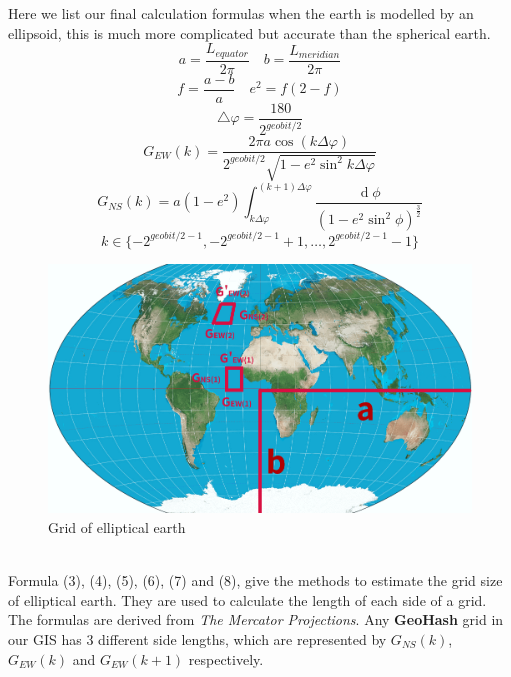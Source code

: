 \documentclass[sigplan,screen]{acmart}
\begin{document}
Here we list our final calculation formulas when the earth is modelled by an ellipsoid, this is much more complicated but accurate than the spherical earth.
\begin{equation}
	a=\frac{L_{equator}}{2\pi}\quad b=\frac{L_{meridian}}{2\pi}
\end{equation}
\begin{equation}
	f=\frac{a-b}{a}\quad e^2=f(2-f)
\end{equation}
\begin{equation}
	\bigtriangleup\varphi=\frac{180}{2^{geobit/2}}
\end{equation}
\begin{equation}
	G_{EW}(k)=\frac{2\pi a\cos(k\Delta\varphi)}{2^{geobit/2}\sqrt{1-e^2\sin^2k\Delta\varphi}}
\end{equation}
\begin{equation}
	G_{NS}(k)=a(1-e^2)\int_{k\Delta\varphi}^{(k+1)\Delta\varphi}\frac{\operatorname d\phi}{{(1-e^2\sin^2\phi)}^\frac32}
\end{equation}
\begin{equation}
	k\in\{-2^{geobit/2-1}, -2^{geobit/2-1}+1, \ldots, 2^{geobit/2-1}-1\}
\end{equation}
\begin{figure}[htb]
	\centering\includegraphics[width=\linewidth]{earth.png}
	\caption{Grid of elliptical earth}
\end{figure}
\\
Formula (3), (4), (5), (6), (7) and (8), give the methods to estimate the grid size of elliptical earth.
They are used to calculate the length of each side of a grid.
The formulas are derived from \textit{The Mercator Projections}\cite{osborne2013mercator}.
Any \textbf{GeoHash} grid in our GIS has 3 different side lengths, which are represented by $G_{NS}(k)$, $G_{EW}(k)$ and $G_{EW}(k+1)$ respectively.
\end{document}
